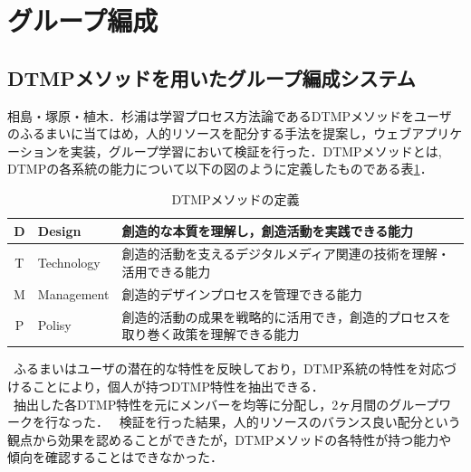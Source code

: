 \documentclass{funthesis}
\begin{document}
\section{グループ編成}

\subsection{DTMPメソッドを用いたグループ編成システム}

相島・塚原・植木．杉浦\cite{A5}は学習プロセス方法論であるDTMPメソッドをユーザのふるまいに当てはめ，人的リソースを配分する手法を提案し，ウェブアプリケーションを実装，グループ学習において検証を行った．DTMPメソッドとは,  DTMPの各系統の能力について以下の図のように定義したものである表\ref{DTMP}．

\begin{table}[h]
\begin{center}
  \begin{tabular}{|c|p{25mm}|p{105mm}|} \hline
    D & Design & 創造的な本質を理解し，創造活動を実践できる能力\tabularnewline \hline
    T & Technology & 
    創造的活動を支えるデジタルメディア関連の技術を理解・活用できる能力\tabularnewline \hline
    M &Management & 
    創造的デザインプロセスを管理できる能力\tabularnewline \hline
    P &Polisy &
    創造的活動の成果を戦略的に活用でき，創造的プロセスを取り巻く政策を理解できる能力\tabularnewline
    \hline
  \end{tabular}
  \caption{DTMPメソッドの定義}
  \label{DTMP}
  \end{center}
\end{table}


\ ふるまいはユーザの潜在的な特性を反映しており，DTMP系統の特性を対応づけることにより，個人が持つDTMP特性を抽出できる．\\
\ 抽出した各DTMP特性を元にメンバーを均等に分配し，2ヶ月間のグループワークを行なった．
\ 検証を行った結果，人的リソースのバランス良い配分という観点から効果を認めることができたが，DTMPメソッドの各特性が持つ能力や傾向を確認することはできなかった．
\end{document}
